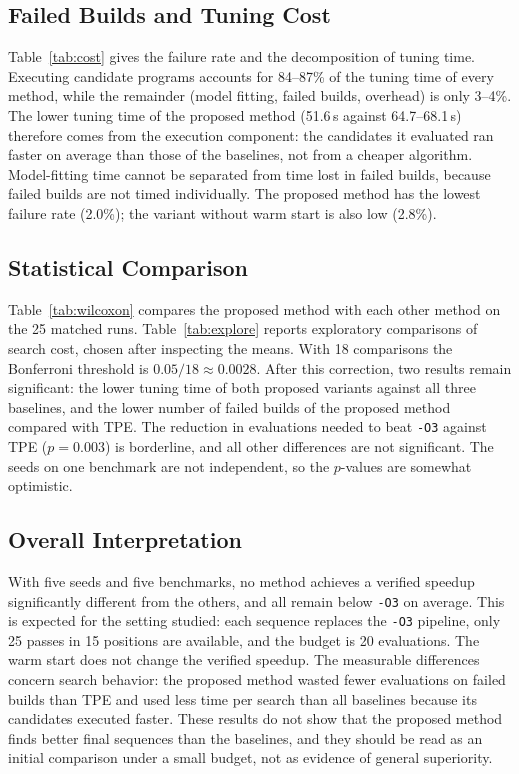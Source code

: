 \subsection{Failed Builds and Tuning Cost}
Table~\ref{tab:cost} gives the failure rate and the decomposition of tuning time. Executing candidate programs accounts for 84--87\% of the tuning time of every method, while the remainder (model fitting, failed builds, overhead) is only 3--4\%. The lower tuning time of the proposed method (51.6\,s against 64.7--68.1\,s) therefore comes from the execution component: the candidates it evaluated ran faster on average than those of the baselines, not from a cheaper algorithm. Model-fitting time cannot be separated from time lost in failed builds, because failed builds are not timed individually. The proposed method has the lowest failure rate (2.0\%); the variant without warm start is also low (2.8\%).

\subsection{Statistical Comparison}
Table~\ref{tab:wilcoxon} compares the proposed method with each other method on the 25 matched runs. Table~\ref{tab:explore} reports exploratory comparisons of search cost, chosen after inspecting the means. With 18 comparisons the Bonferroni threshold is $0.05/18 \approx 0.0028$. After this correction, two results remain significant: the lower tuning time of both proposed variants against all three baselines, and the lower number of failed builds of the proposed method compared with TPE. The reduction in evaluations needed to beat \texttt{-O3} against TPE ($p = 0.003$) is borderline, and all other differences are not significant. The seeds on one benchmark are not independent, so the $p$-values are somewhat optimistic.

\subsection{Overall Interpretation}
With five seeds and five benchmarks, no method achieves a verified speedup significantly different from the others, and all remain below \texttt{-O3} on average. This is expected for the setting studied: each sequence replaces the \texttt{-O3} pipeline, only 25 passes in 15 positions are available, and the budget is 20 evaluations. The warm start does not change the verified speedup. The measurable differences concern search behavior: the proposed method wasted fewer evaluations on failed builds than TPE and used less time per search than all baselines because its candidates executed faster. These results do not show that the proposed method finds better final sequences than the baselines, and they should be read as an initial comparison under a small budget, not as evidence of general superiority.

